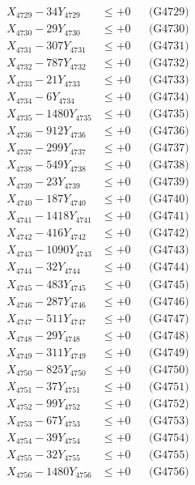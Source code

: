 \documentclass[a4paper,10pt]{article}
\begin{document}
{\begin{align}
X_{4729} - 34Y_{4729} &\leq +0 && \text{(G4729)} \\
X_{4730} - 29Y_{4730} &\leq +0 && \text{(G4730)} \\
\allowbreak
X_{4731} - 307Y_{4731} &\leq +0 && \text{(G4731)} \\
X_{4732} - 787Y_{4732} &\leq +0 && \text{(G4732)} \\
X_{4733} - 21Y_{4733} &\leq +0 && \text{(G4733)} \\
X_{4734} - 6Y_{4734} &\leq +0 && \text{(G4734)} \\
X_{4735} - 1480Y_{4735} &\leq +0 && \text{(G4735)} \\
X_{4736} - 912Y_{4736} &\leq +0 && \text{(G4736)} \\
X_{4737} - 299Y_{4737} &\leq +0 && \text{(G4737)} \\
X_{4738} - 549Y_{4738} &\leq +0 && \text{(G4738)} \\
X_{4739} - 23Y_{4739} &\leq +0 && \text{(G4739)} \\
X_{4740} - 187Y_{4740} &\leq +0 && \text{(G4740)} \\
\allowbreak
X_{4741} - 1418Y_{4741} &\leq +0 && \text{(G4741)} \\
X_{4742} - 416Y_{4742} &\leq +0 && \text{(G4742)} \\
X_{4743} - 1090Y_{4743} &\leq +0 && \text{(G4743)} \\
X_{4744} - 32Y_{4744} &\leq +0 && \text{(G4744)} \\
X_{4745} - 483Y_{4745} &\leq +0 && \text{(G4745)} \\
X_{4746} - 287Y_{4746} &\leq +0 && \text{(G4746)} \\
X_{4747} - 511Y_{4747} &\leq +0 && \text{(G4747)} \\
X_{4748} - 29Y_{4748} &\leq +0 && \text{(G4748)} \\
X_{4749} - 311Y_{4749} &\leq +0 && \text{(G4749)} \\
X_{4750} - 825Y_{4750} &\leq +0 && \text{(G4750)} \\
\allowbreak
X_{4751} - 37Y_{4751} &\leq +0 && \text{(G4751)} \\
X_{4752} - 99Y_{4752} &\leq +0 && \text{(G4752)} \\
X_{4753} - 67Y_{4753} &\leq +0 && \text{(G4753)} \\
X_{4754} - 39Y_{4754} &\leq +0 && \text{(G4754)} \\
X_{4755} - 32Y_{4755} &\leq +0 && \text{(G4755)} \\
X_{4756} - 1480Y_{4756} &\leq +0 && \text{(G4756)} \\

\end{align}}
\end{document}
